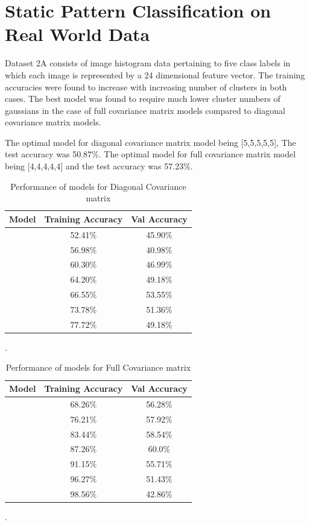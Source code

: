 \section{Static Pattern Classification on Real World Data}

Dataset 2A consists of image histogram data pertaining to five class labels in which each image is represented by a 24 dimensional feature vector. The training accuracies were found to increase with increasing number of clusters in both cases. The best model was found to require much lower cluster numbers of gaussians in the case of full covariance matrix models compared to diagonal covariance matrix models. 

 The optimal model for diagonal covariance matrix model being [5,5,5,5,5], The test accuracy was 50.87$\%$. The optimal model for full covariance matrix model being [4,4,4,4,4] and the test accuracy was 57.23$\%$.


{
\begin{table}[!h]
\centering
\begin{tabular}{ |c|c|c|  }
\hline
\rowcolor{lightgray} Model & Training Accuracy & Val Accuracy \\
\hline
[1,1,1,1,1] & 52.41$\%$  & 45.90$\%$ \\   
 \hline
[2,2,2,2,2] & 56.98$\%$  & 40.98$\%$ \\ 
\hline
[3,3,3,3,3] & 60.30$\%$  & 46.99$\%$ \\
\hline
[4,4,4,4,4] & 64.20$\%$  & 49.18$\%$ \\
\hline
[5,5,5,5,5] & 66.55$\%$  & 53.55$\%$ \\
\hline
[8,8,8,8,8] & 73.78$\%$  & 51.36$\%$ \\
\hline
[11,11,11,11,11] & 77.72$\%$  & 49.18$\%$ \\
\hline
\end{tabular}
\caption{Performance of models for Diagonal Covariance matrix}.
\label{table:7}
\end{table}
}
\newpage
{
\begin{table}[!h]
\centering
\begin{tabular}{ |c|c|c|  }
\hline
\rowcolor{lightgray} Model & Training Accuracy & Val Accuracy \\
\hline
[1,1,1,1,1] & 68.26$\%$  & 56.28$\%$ \\   
 \hline
[2,2,2,2,2] & 76.21$\%$  & 57.92$\%$ \\ 
\hline
[3,3,3,3,3] & 83.44$\%$  & 58.54$\%$ \\
\hline
[4,4,4,4,4] & 87.26$\%$  & 60.0$\%$ \\
\hline
[5,5,5,5,5] & 91.15$\%$  & 55.71$\%$ \\
\hline
[8,8,8,8,8] & 96.27$\%$  & 51.43$\%$ \\
\hline
[10,10,10,10,10] & 98.56$\%$  & 42.86$\%$ \\
\hline
\end{tabular}
\caption{Performance of models for Full Covariance matrix}.
\label{table:8}
\end{table}
}


